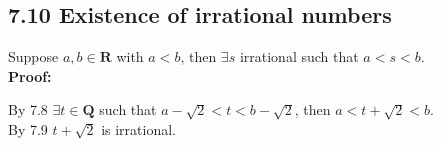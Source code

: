 \documentclass{article}
\begin{document}
\subsection*{7.10 Existence of irrational numbers}
Suppose $a, b \in \mathbf{R}$ with $a < b$, then $\exists s$ irrational such that $a < s < b$.\\
\textbf{Proof:}
\begin{addmargin}[1em]{0em}
    By 7.8 $\exists t \in \mathbf{Q}$ such that $a - \sqrt{2} < t < b - \sqrt{2}$, then $a < t + \sqrt{2} < b$.\\
    By 7.9 $t + \sqrt{2}$ is irrational.
\end{addmargin}
\end{document}
